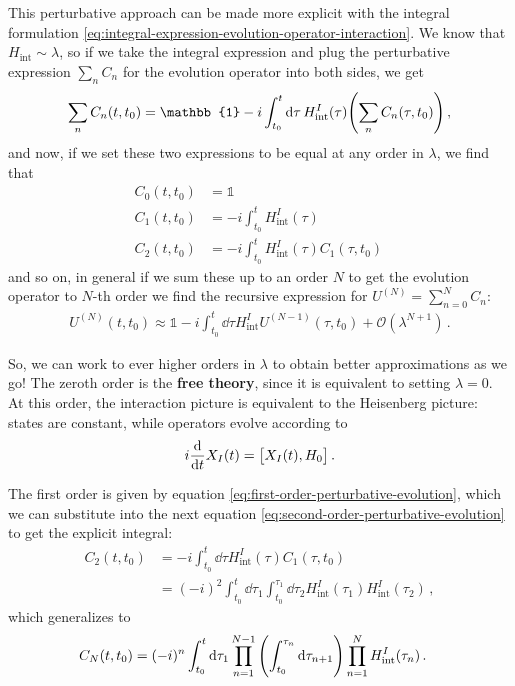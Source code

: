 \documentclass[main.tex]{subfiles}
\begin{document}
This perturbative approach can be made more explicit with the integral formulation \eqref{eq:integral-expression-evolution-operator-interaction}.
We know that \(H _{\text{int}} \sim \lambda \), so if we take the integral expression and plug the perturbative expression \(\sum _{n} C_n\) for the evolution operator into both sides, we get 
%
\begin{align}
\sum _{n} C_n(t, t_0 ) = \mathbb{1} - i \int_{t_0 }^{t} \dd{\tau }
H _{\text{int}}^{I} (\tau ) \qty(\sum _{n} C_n(\tau , t_0 ))
\,,
\end{align}
%
and now, if we set these two expressions to be equal at any order in \(\lambda \), we find that 
%
\begin{align}
C_0 (t, t_0 ) &= \mathbb{1}   \\
C_1 (t, t_0 ) &=  - i \int_{t_0 }^{t} H _{\text{int}}^{I} (\tau) \label{eq:first-order-perturbative-evolution} \\
C_2 (t, t_0 ) &=  - i \int_{t_0 }^{t} H _{\text{int}}^{I} (\tau) C_1 (\tau , t_0 ) \label{eq:second-order-perturbative-evolution}
\,
\end{align}
%
and so on, in general if we sum these up to an order \(N\) to get the evolution operator to \(N\)-th order we find the recursive expression for \(U^{(N)} = \sum _{n=0}^{N} C_n\):
%
\begin{align}
U^{(N)} (t,  t_0  )
\approx \mathbb{1} - i \int_{t_0 }^{t} \dd{\tau } H _{\text{int}}^{I} U^{(N-1)} (\tau , t_0 ) + \mathcal{O} (\lambda^{N+1})
\,.
\end{align}

So, we can work to ever higher orders in \(\lambda \) to obtain better approximations as we go! 
The zeroth order is the \textbf{free theory}, since it is equivalent to setting \(\lambda = 0\). At this order, the interaction picture is equivalent to the Heisenberg picture: states are constant, while operators evolve according to 
%
\begin{align}
i \dv{}{t} X_I (t ) = \qty[X_I (t), H_0 ]
\,.
\end{align}

The first order is given by equation \eqref{eq:first-order-perturbative-evolution}, which we can substitute into the next equation \eqref{eq:second-order-perturbative-evolution} to get the explicit integral: 
%
\begin{align}
C_2 (t, t_0 ) &=  
- i \int_{t_0 }^{t} \dd{\tau } H _{\text{int}}^{I} (\tau ) C_1 (\tau, t_0 )  \\ 
&= (-i)^2 \int_{t_0}^{t} \dd{\tau_1 } \int_{t_0 }^{\tau_1 } \dd{\tau_2 }
H _{\text{int}}^{I} (\tau_1 ) 
H _{\text{int}}^{I} (\tau_2 ) 
\label{eq:second-order-correction-no-time-ordering}
\,,
\end{align}
%
which generalizes to 
%
\begin{align}
C_N (t, t_0 ) &=
(-i)^{n}
\int_{t_0 }^{t} \dd{\tau_1 }
\prod_{n=1}^{N-1} \qty(\int_{t_0 }^{\tau_{n}} \dd{\tau_{n+1}})
\prod_{n=1}^{N} H _{\text{int}}^{I} (\tau_{n})
\,.
\end{align}
\end{document}
